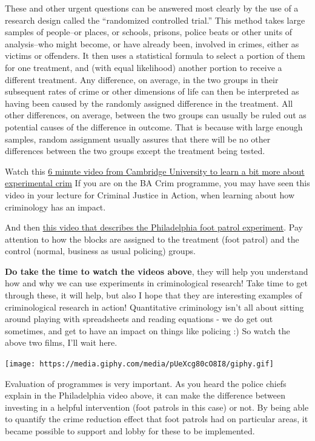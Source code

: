 \documentclass[]{book}
\theoremstyle{definition}
\theoremstyle{definition}
\theoremstyle{definition}
\theoremstyle{remark}
\begin{document}
These and other urgent questions can be answered most clearly by the use
of a research design called the ``randomized controlled trial.'' This
method takes large samples of people--or places, or schools, prisons,
police beats or other units of analysis--who might become, or have
already been, involved in crimes, either as victims or offenders. It
then uses a statistical formula to select a portion of them for one
treatment, and (with equal likelihood) another portion to receive a
different treatment. Any difference, on average, in the two groups in
their subsequent rates of crime or other dimensions of life can then be
interpreted as having been caused by the randomly assigned difference in
the treatment. All other differences, on average, between the two groups
can usually be ruled out as potential causes of the difference in
outcome. That is because with large enough samples, random assignment
usually assures that there will be no other differences between the two
groups except the treatment being tested.

Watch this
\href{https://www.youtube.com/watch?v=IGDF1-B1Yjs\&feature=player_embedded}{6
minute video from Cambridge University to learn a bit more about
experimental crim} If you are on the BA Crim programme, you may have
seen this video in your lecture for Criminal Justice in Action, when
learning about how criminology has an impact.

And then
\href{http://www.cla.temple.edu/cj/center-for-security-and-crime-science/the-philadelphia-foot-patrol-experiment/}{this
video that describes the Philadelphia foot patrol experiment}. Pay
attention to how the blocks are assigned to the treatment (foot patrol)
and the control (normal, business as usual policing) groups.

\textbf{Do take the time to watch the videos above}, they will help you
understand how and why we can use experiments in criminological
research! Take time to get through these, it will help, but also I hope
that they are interesting examples of criminological research in action!
Quantitative criminology isn't all about sitting around playing with
spreadsheets and reading equations - we do get out sometimes, and get to
have an impact on things like policing :) So watch the above two films,
I'll wait here.

\texttt{[image: https://media.giphy.com/media/pUeXcg80cO8I8/giphy.gif]}

Evaluation of programmes is very important. As you heard the police
chiefs explain in the Philadelphia video above, it can make the
difference between investing in a helpful intervention (foot patrols in
this case) or not. By being able to quantify the crime reduction effect
that foot patrols had on particular areas, it became possible to support
and lobby for these to be implemented.
\end{document}
